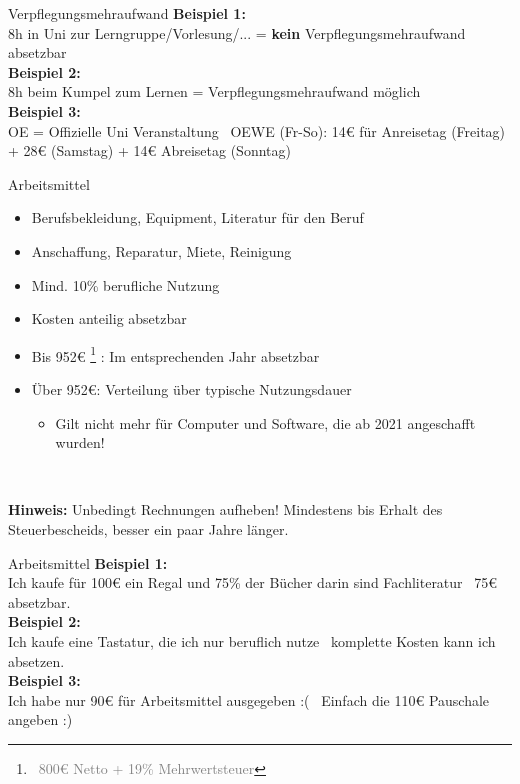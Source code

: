 \documentclass[draft]{beamer}
\newcommand{\n}{\hfill\\\vspace{0.25cm}}
\let\oldfootnote\footnote
\renewcommand{\footnote}[1]
{%
	\oldfootnote
	{
		\tiny
		\textcolor{gray}{\ #1}
	}%
}
\begin{document}
			\begin{frame}{Verpflegungsmehraufwand}
				\textbf{Beispiel 1:}\\
				8h in Uni zur Lerngruppe/Vorlesung/... = \textbf{kein} Verpflegungsmehraufwand absetzbar\n\pause
				\textbf{Beispiel 2:}\\
				8h beim Kumpel zum Lernen = Verpflegungsmehraufwand möglich\n\pause
				\textbf{Beispiel 3:}\\
				OE = Offizielle Uni Veranstaltung \textrightarrow\ OEWE (Fr-So): 14€ für Anreisetag (Freitag) + 28€ (Samstag) + 14€ Abreisetag (Sonntag)
			\end{frame}
		
			\begin{frame}{Arbeitsmittel}
				\begin{itemize}
					\item Berufsbekleidung, Equipment, Literatur für den Beruf
					\item Anschaffung, Reparatur, Miete, Reinigung
					\item Mind. 10\% berufliche Nutzung
					\item Kosten anteilig absetzbar
					\item Bis 952€\footnote{800€ Netto + 19\% Mehrwertsteuer}: Im entsprechenden Jahr absetzbar
					\item Über 952€: Verteilung über typische Nutzungsdauer
					\begin{itemize}
						\item Gilt nicht mehr für Computer und Software, die ab 2021 angeschafft wurden!
					\end{itemize}
				\end{itemize}\n\pause
			
				\textbf{Hinweis:} Unbedingt Rechnungen aufheben! Mindestens bis Erhalt des Steuerbescheids, besser ein paar Jahre länger.
			\end{frame}
		
			\begin{frame}{Arbeitsmittel}
				\textbf{Beispiel 1:}\\
				Ich kaufe für 100€ ein Regal und 75\% der Bücher darin sind Fachliteratur \textrightarrow\ 75€ absetzbar.\n\pause
				\textbf{Beispiel 2:}\\
				Ich kaufe eine Tastatur, die ich nur beruflich nutze \textrightarrow\ komplette Kosten kann ich absetzen.\n\pause
				\textbf{Beispiel 3:}\\
				Ich habe nur 90€ für Arbeitsmittel ausgegeben :( \textrightarrow\ Einfach die 110€ Pauschale angeben :)
			\end{frame}
		
\end{document}
